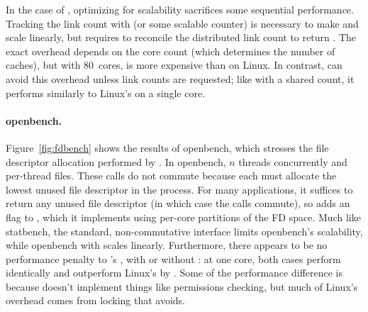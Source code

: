 In the case of , optimizing for scalability sacrifices some
sequential performance.  Tracking the link count with 
(or some scalable counter) is necessary to make  and
 scale linearly, but requires  to reconcile the
distributed link count to return .  The exact overhead
depends on the core count (which determines the number of 
caches), but with 80~cores,  is 
more expensive than on Linux.  
In contrast,  can avoid this overhead unless link counts are
requested; like  with a shared count, it performs similarly to Linux's  on
a single core.

\paragraph{openbench.} Figure~\ref{fig:fdbench} shows the results
of openbench, which stresses the file descriptor allocation performed by
.  In openbench, $n$ threads concurrently  and
 per-thread files.  These calls do not commute because each
 must allocate the lowest unused file
descriptor in the process.  For many applications, it suffices to return
any unused file descriptor (in which case the  calls commute),
so \sys adds an  flag to , which it implements
using per-core partitions of the FD space.  Much like
statbench, the standard, non-commutative  interface limits
openbench's scalability, while openbench with  scales
linearly.  Furthermore, there appears to be no performance penalty to
\fs's , with or without : at one core, both
cases perform identically and outperform Linux's  by
.
Some of the performance difference is because \sys doesn't implement things like
permissions checking, but much of Linux's overhead comes from locking
that \fs avoids.

